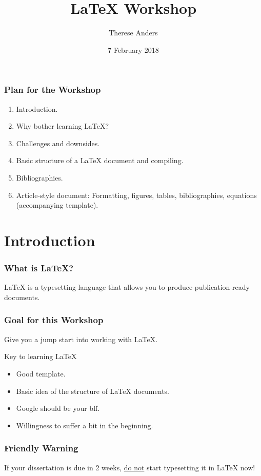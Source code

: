 \documentclass{beamer} %
\title[{\LaTeX} Workshop] %
{{\LaTeX}  Workshop}
\subtitle{}
\author[Therese Anders] %
{Therese Anders\inst{1}}
\institute[] %
{
  \inst{1}%
  PhD Candidate\\
  School of International Relations\\
  University of Southern California
}
\date[7 February 2018] %
{7 February 2018}
\begin{document}
\frame{\titlepage}



\begin{frame}
\frametitle{Plan for the Workshop}
\begin{enumerate}
\item Introduction. \hyperlink{intro}{\beamerbutton{$\rightarrow$}}
\item Why bother learning {\LaTeX}? \hyperlink{why}{\beamerbutton{$\rightarrow$}}
\item Challenges and downsides. \hyperlink{challenge}{\beamerbutton{$\rightarrow$}}
\item Basic structure of a {\LaTeX} document and compiling.  \hyperlink{structure}{\beamerbutton{$\rightarrow$}}
\item Bibliographies.\hyperlink{bib}{\beamerbutton{$\rightarrow$}}
\item Article-style document: Formatting, figures, tables, bibliographies, equations (accompanying template).
\end{enumerate}
\end{frame}

\section{Introduction}\label{intro}
 
 \begin{frame}
 \frametitle{What is {\LaTeX?}}
 {\LaTeX} is a typesetting language that allows you to produce publication-ready documents.
 \end{frame}
 
\begin{frame}
\frametitle{Goal for this Workshop}
Give you a jump start into working with {\LaTeX}.  \pause
\begin{block}{Key to learning {\LaTeX}}
{\begin{itemize}
\item<1-> Good template.
\item<2-> Basic idea of the structure of  {\LaTeX} documents.
\item<3-> Google should be your bff.
\item<4-> Willingness to suffer a bit in the beginning.
\end{itemize}}
\end{block}
\end{frame}
 
 \begin{frame}
\frametitle{Friendly Warning}
If your dissertation is due in 2 weeks, {\Huge\underline{do not}} start typesetting it in {\LaTeX} now!
\end{frame}
 
\end{document}
